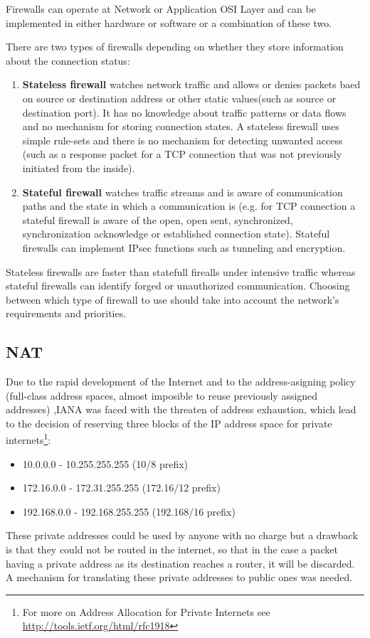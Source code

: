 \begin{itemize}
Firewalls can operate at Network or Application OSI Layer and can be implemented in either hardware or software or a combination of these two.
 
There are two types of firewalls depending on whether they store information about the connection status:
\begin{enumerate}
\item{\textbf{Stateless firewall}} watches network traffic and  allows or denies packets baed on source or destination address or other static values(such as source or destination port). It has no knowledge about traffic patterns or data flows and no mechanism for storing connection states. A stateless firewall uses simple rule-sets and there is no mechanism for detecting unwanted access (such as a response packet for a TCP connection that was not previously initiated from the inside).
\item{\textbf{Stateful firewall}} watches traffic streams and is aware of communication paths and the state in which a communication is (e.g. for TCP connection a stateful firewall is aware of the open, open sent, synchronized, synchronization acknowledge or established connection state). Stateful firewalls can implement IPsec functions such as tunneling and encryption.
\end{enumerate}
Stateless firewalls are faster than statefull firealls under intensive traffic whereas stateful firewalls can identify forged or unauthorized communication.
Choosing between which type of firewall to use should take into account the network's requirements and priorities.  
\subsection{NAT}
\label{sub-sec:nat}
Due to the rapid development of the Internet and to the address-asigning policy (full-class address spaces, almost imposible to reuse previously assigned addresses) ,IANA was faced with the threaten of address exhaustion, which lead to the decision of reserving three blocks of the IP address space for private internets\footnote{For more on Address Allocation for Private Internets see \url{http://tools.ietf.org/html/rfc1918}}:
\begin{itemize}
\item10.0.0.0        -   10.255.255.255  (10/8 prefix)
\item172.16.0.0      -   172.31.255.255  (172.16/12 prefix)
\item192.168.0.0     -   192.168.255.255 (192.168/16 prefix)
\end{itemize}
These private addresses could be used by anyone with no charge but a drawback is that they could not be routed in the internet, so that in the case a packet having a private address as its destination reaches a router, it will be discarded. A mechanism for translating these private addresses to public ones was needed.


\end{itemize}
